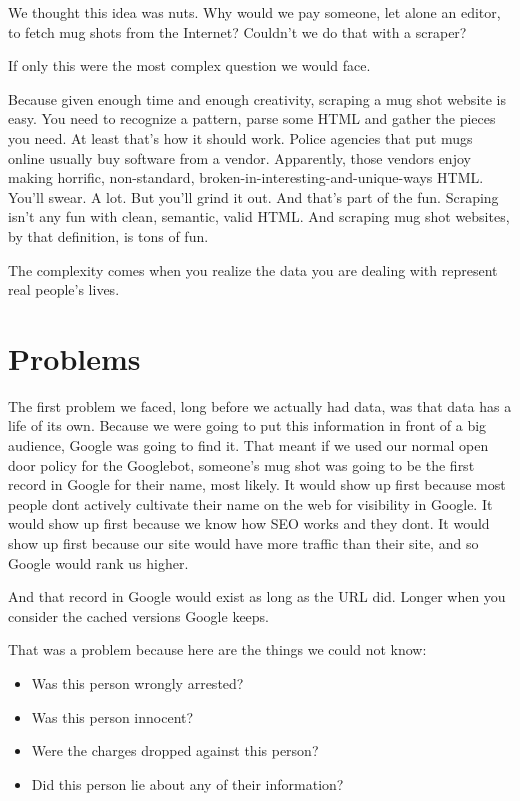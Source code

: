 \documentclass[
  letterpaper,
  DIV=11,
  numbers=noendperiod]{scrreprt}
\providecommand{\tightlist}{%
  \setlength{\itemsep}{0pt}\setlength{\parskip}{0pt}}\usepackage{longtable,booktabs,array}
\begin{document}
We thought this idea was nuts. Why would we pay someone, let alone an
editor, to fetch mug shots from the Internet? Couldn't we do that with a
scraper?

If only this were the most complex question we would face.

Because given enough time and enough creativity, scraping a mug shot
website is easy. You need to recognize a pattern, parse some HTML and
gather the pieces you need. At least that's how it should work. Police
agencies that put mugs online usually buy software from a vendor.
Apparently, those vendors enjoy making horrific, non-standard,
broken-in-interesting-and-unique-ways HTML. You'll swear. A lot. But
you'll grind it out. And that's part of the fun. Scraping isn't any fun
with clean, semantic, valid HTML. And scraping mug shot websites, by
that definition, is tons of fun.

The complexity comes when you realize the data you are dealing with
represent real people's lives.

\hypertarget{problems}{%
\section{Problems}\label{problems}}

The first problem we faced, long before we actually had data, was that
data has a life of its own. Because we were going to put this
information in front of a big audience, Google was going to find it.
That meant if we used our normal open door policy for the Googlebot,
someone's mug shot was going to be the first record in Google for their
name, most likely. It would show up first because most people dont
actively cultivate their name on the web for visibility in Google. It
would show up first because we know how SEO works and they dont. It
would show up first because our site would have more traffic than their
site, and so Google would rank us higher.

And that record in Google would exist as long as the URL did. Longer
when you consider the cached versions Google keeps.

That was a problem because here are the things we could not know:

\begin{itemize}
\tightlist
\item
  Was this person wrongly arrested?
\item
  Was this person innocent?
\item
  Were the charges dropped against this person?
\item
  Did this person lie about any of their information?
\end{itemize}
\end{document}
